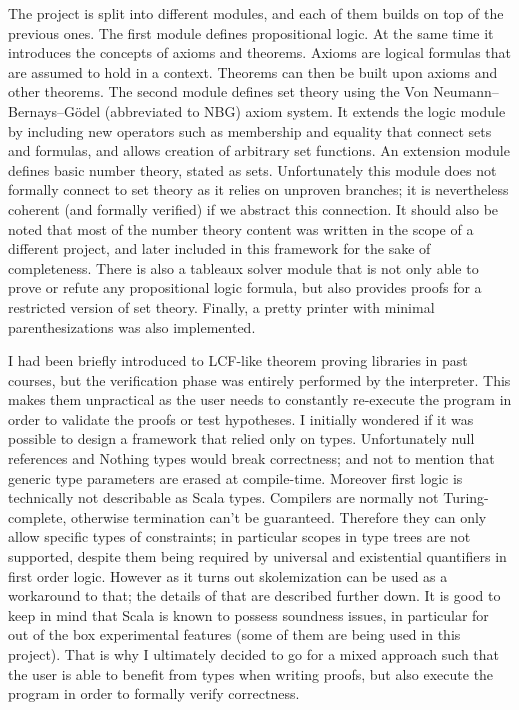 \documentclass[acmlarge]{acmart}
\begin{document}
The project is split into different modules, and each of them builds on top of the previous ones. The first module defines propositional logic. At the same time it introduces the concepts of axioms and theorems. Axioms are logical formulas that are assumed to hold in a context. Theorems can then be built upon axioms and other theorems. The second module defines set theory using the Von Neumann–Bernays–Gödel (abbreviated to NBG) axiom system. It extends the logic module by including new operators such as membership and equality that connect sets and formulas, and allows creation of arbitrary set functions. An extension module defines basic number theory, stated as sets. Unfortunately this module does not formally connect to set theory as it relies on unproven branches; it is nevertheless coherent (and formally verified) if we abstract this connection. It should also be noted that most of the number theory content was written in the scope of a different project, and later included in this framework for the sake of completeness. There is also a tableaux solver module that is not only able to prove or refute any propositional logic formula, but also provides proofs for a restricted version of set theory. Finally, a pretty printer with minimal parenthesizations was also implemented.

I had been briefly introduced to LCF-like theorem proving libraries in past courses, but the verification phase was entirely performed by the interpreter. This makes them unpractical as the user needs to constantly re-execute the program in order to validate the proofs or test hypotheses. I initially wondered if it was possible to design a framework that relied only on types. Unfortunately null references and Nothing types would break correctness; and not to mention that generic type parameters are erased at compile-time. Moreover first logic is technically not describable as Scala types. Compilers are normally not Turing-complete, otherwise termination can't be guaranteed. Therefore they can only allow specific types of constraints; in particular scopes in type trees are not supported, despite them being required by universal and existential quantifiers in first order logic. However as it turns out skolemization can be used as a workaround to that; the details of that are described further down. It is good to keep in mind that Scala is known to possess soundness issues, in particular for out of the box experimental features (some of them are being used in this project). That is why I ultimately decided to go for a mixed approach such that the user is able to benefit from types when writing proofs, but also execute the program in order to formally verify correctness.
\end{document}
